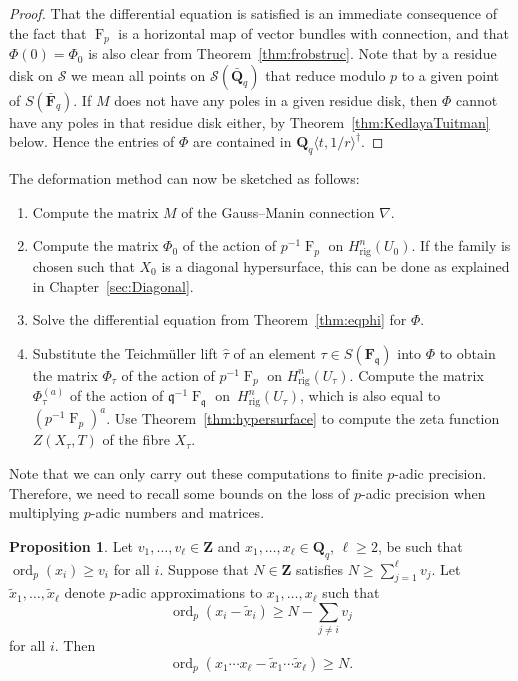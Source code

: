 \documentclass[a4paper,11pt]{article}
\numberwithin{equation}{section}
\newcommand{\ZZ}{\mathbf{Z}} %
\newcommand{\QQ}{\mathbf{Q}} %
\newcommand{\FF}{\mathbf{F}} %
\DeclareMathOperator{\ord}{ord}          %
\DeclareMathOperator{\Frob}{F}           %
\providecommand{\Hrig}{H_{\text{rig}}}  %
\theoremstyle{definition}
\newtheorem{prop}[thm]{Proposition}
\begin{document}
\begin{proof}
That the differential equation is satisfied is an immediate consequence of the 
fact that $\Frob_p$ is a horizontal map of vector bundles with connection, and 
that $\Phi(0)=\Phi_0$ is also clear from Theorem~\ref{thm:frobstruc}. Note that
by a residue disk on $\mathcal{S}$ we mean all points on $\mathcal{S}(\bar{\QQ}_q)$ 
that reduce modulo $p$ to a given point of $S(\bar{\FF}_q)$.
If $M$ does not have any poles in a given residue disk, then $\Phi$ cannot have 
any poles in that residue disk either, by Theorem~\ref{thm:KedlayaTuitman} 
below. Hence the entries of $\Phi$ are contained in 
$\QQ_q \langle t, 1/r \rangle^{\dag}$.
\end{proof}

The deformation method can now be sketched as follows:
\begin{enumerate}[\it Step 1.]
\item Compute the matrix $M$ of the Gauss--Manin connection $\nabla$.
\item Compute the matrix $\Phi_0$ of the action of $p^{-1}\Frob_p$ on 
      $\Hrig^n(U_0)$. If the family is chosen such that $X_0$ is a diagonal 
      hypersurface, this can be done as
      explained in Chapter~\ref{sec:Diagonal}.
\item Solve the differential equation from Theorem~\ref{thm:eqphi} for $\Phi$.
\item Substitute the Teichm\"uller lift $\hat{\tau}$ of an element 
      $\tau \in S(\FF_{\mathfrak{q}})$ into $\Phi$ to obtain the 
      matrix $\Phi_{\tau}$ of the action of $p^{-1}\Frob_p$ on 
      $\Hrig^n(U_{\tau})$. Compute the matrix $\Phi_{\tau}^{(a)}$ 
      of the action of $\mathfrak{q}^{-1} \Frob_{\mathfrak{q}}$ 
      on~$\Hrig^n(U_{\tau})$, which is also equal to $(p^{-1}\Frob_p)^a$.
      Use Theorem~\ref{thm:hypersurface} to compute the zeta function 
      $Z(X_{\tau},T)$ of the fibre $X_{\tau}$.
\end{enumerate}


Note that we can only carry out these computations to finite $p$-adic 
precision. Therefore, we need to recall some bounds on the loss of $p$-adic 
precision when multiplying $p$-adic numbers and matrices. 

\begin{prop} \label{prop:productval}
Let $v_1,\dotsc,v_{\ell} \in \ZZ$ and $x_1, \dotsc, x_{\ell} \in \mathbf{Q}_q$,  
$\ell \geq 2$, be such that $\ord_p(x_i) \geq v_i$ for all $i$. Suppose that 
$N \in \ZZ$ satisfies $N \geq \sum_{j=1}^{\ell} v_j$. Let 
$\tilde{x}_1, \dotsc, \tilde{x}_{\ell}$ denote $p$-adic approximations to 
$x_1, \dotsc, x_{\ell}$ such that 
\[
\ord_p\left(x_i - \tilde{x}_i\right) \geq N - \sum_{j \neq i} v_j
\] 
for all $i$.  Then 
\begin{equation*}
\ord_p\left(x_1 \dotsm x_{\ell} - \tilde{x}_1 \dotsm \tilde{x}_{\ell}\right) \geq N.
\end{equation*}
\end{prop}
\end{document}

